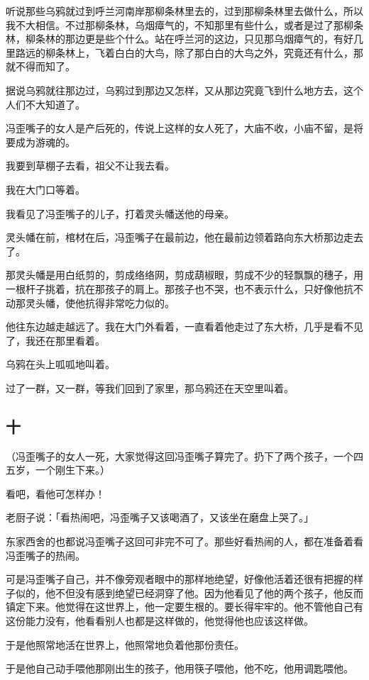\documentclass[UTF8]{ctexart}
\begin{document}
听说那些乌鸦就过到呼兰河南岸那柳条林里去的，过到那柳条林里去做什么，所以我不大相信。不过那柳条林，乌烟瘴气的，不知那里有些什么，或者是过了那柳条林，柳条林的那边更是些个什么。站在呼兰河的这边，只见那乌烟瘴气的，有好几里路远的柳条林上，飞着白白的大鸟，除了那白白的大鸟之外，究竟还有什么，那就不得而知了。

据说乌鸦就往那边过，乌鸦过到那边又怎样，又从那边究竟飞到什么地方去，这个人们不大知道了。

冯歪嘴子的女人是产后死的，传说上这样的女人死了，大庙不收，小庙不留，是将要成为游魂的。

我要到草棚子去看，祖父不让我去看。

我在大门口等着。

我看见了冯歪嘴子的儿子，打着灵头幡送他的母亲。

灵头幡在前，棺材在后，冯歪嘴子在最前边，他在最前边领着路向东大桥那边走去了。

那灵头幡是用白纸剪的，剪成络络网，剪成葫椒眼，剪成不少的轻飘飘的穗子，用一根杆子挑着，抗在那孩子的肩上。那孩子也不哭，也不表示什么，只好像他抗不动那灵头幡，使他抗得非常吃力似的。

他往东边越走越远了。我在大门外看着，一直看着他走过了东大桥，几乎是看不见了，我还在那里看着。

乌鸦在头上呱呱地叫着。

过了一群，又一群，等我们回到了家里，那乌鸦还在天空里叫着。

\subsection{十}

（冯歪嘴子的女人一死，大家觉得这回冯歪嘴子算完了。扔下了两个孩子，一个四五岁，一个刚生下来。）

看吧，看他可怎样办！

老厨子说：「看热闹吧，冯歪嘴子又该喝酒了，又该坐在磨盘上哭了。」

东家西舍的也都说冯歪嘴子这回可非完不可了。那些好看热闹的人，都在准备着看冯歪嘴子的热闹。

可是冯歪嘴子自己，并不像旁观者眼中的那样地绝望，好像他活着还很有把握的样子似的，他不但没有感到绝望已经洞穿了他。因为他看见了他的两个孩子，他反而镇定下来。他觉得在这世界上，他一定要生根的。要长得牢牢的。他不管他自己有这份能力没有，他看看别人也都是这样做的，他觉得他也应该这样做。

于是他照常地活在世界上，他照常地负着他那份责任。

于是他自己动手喂他那刚出生的孩子，他用筷子喂他，他不吃，他用调匙喂他。
\end{document}
